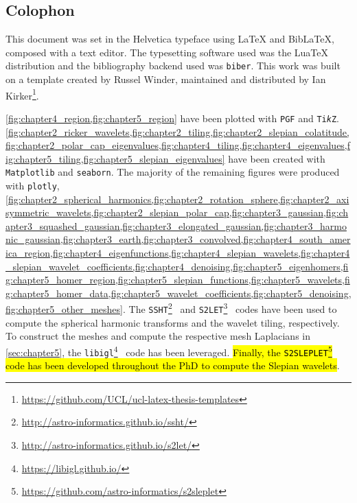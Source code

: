 \begin{appendices}

\chapter{Colophon}\label{sec:appendix}

This document was set in the Helvetica typeface using \LaTeX{} and Bib\LaTeX{}, composed with a text editor.
The typesetting software used was the Lua\TeX{} distribution and the bibliography backend used was \texttt{biber}.
This work was built on a template created by Russel Winder, maintained and distributed by Ian Kirker\footnote{\url{https://github.com/UCL/ucl-latex-thesis-templates}}.

\cref{fig:chapter4_region,fig:chapter5_region} have been plotted with \texttt{PGF} and \texttt{Ti\emph{k}Z}.
\cref{fig:chapter2_ricker_wavelets,fig:chapter2_tiling,fig:chapter2_slepian_colatitude,fig:chapter2_polar_cap_eigenvalues,fig:chapter4_tiling,fig:chapter4_eigenvalues,fig:chapter5_tiling,fig:chapter5_slepian_eigenvalues} have been created with \texttt{Matplotlib} and \texttt{seaborn}.
The majority of the remaining figures were produced with \texttt{plotly}, \ie{} \cref{fig:chapter2_spherical_harmonics,fig:chapter2_rotation_sphere,fig:chapter2_axisymmetric_wavelets,fig:chapter2_slepian_polar_cap,fig:chapter3_gaussian,fig:chapter3_squashed_gaussian,fig:chapter3_elongated_gaussian,fig:chapter3_harmonic_gaussian,fig:chapter3_earth,fig:chapter3_convolved,fig:chapter4_south_america_region,fig:chapter4_eigenfunctions,fig:chapter4_slepian_wavelets,fig:chapter4_slepian_wavelet_coefficients,fig:chapter4_denoising,fig:chapter5_eigenhomers,fig:chapter5_homer_region,fig:chapter5_slepian_functions,fig:chapter5_wavelets,fig:chapter5_homer_data,fig:chapter5_wavelet_coefficients,fig:chapter5_denoising,fig:chapter5_other_meshes}.
The \texttt{SSHT}\footnote{\url{http://astro-informatics.github.io/ssht/}}~\cite{McEwen2011} and \texttt{S2LET}\footnote{\url{http://astro-informatics.github.io/s2let/}}~\cite{Leistedt2013} codes have been used to compute the spherical harmonic transforms and the wavelet tiling, respectively.
To construct the meshes and compute the respective mesh Laplacians in \cref{sec:chapter5}, the \texttt{libigl}\footnote{\url{https://libigl.github.io/}}~\cite{Libigl2017} code has been leveraged.
\hl{Finally, the \texttt{S2SLEPLET}\footnote{\url{https://github.com/astro-informatics/s2sleplet}} code has been developed throughout the PhD to compute the Slepian wavelets}.



\end{appendices}
